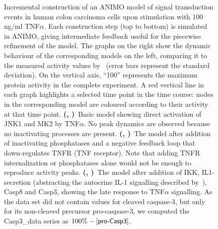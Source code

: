 \begin{figure}[!bhtp]
\begin{tabular}{ll}
\end{tabular}
  \caption{
Incremental construction of an ANIMO model of signal transduction
events in human colon carcinoma cells upon stimulation with 100 ng/ml TNF$\alpha$.
Each construction step (top to bottom) is simulated in ANIMO, giving intermediate feedback
useful for the piecewise refinement of the model.
The graphs on the right show the dynamic behaviour of the corresponding models on the left, comparing it to the measured
activity values by~\cite{pathway-compendium} (error bars represent the standard deviation).
On the vertical axis, ``100'' represents the maximum protein activity in the complete experiment.
A red vertical line in each graph highlights a selected time point in the time course:
nodes in the corresponding model are coloured according to their activity at that time point.
{\bf (\protect{}, \protect{})}~Basic model showing direct activation of JNK1 and MK2 by TNF$\alpha$.
No peak dynamics are observed because no inactivating processes are present.
{\bf (\protect{}, \protect{})}~The model after addition of inactivating phosphatases and a
negative feedback loop that down-regulates TNFR (TNF receptor). Note that adding TNFR internalization or phosphatases alone would not be enough to reproduce activity peaks.
{\bf (\protect{}, \protect{})}~The model after addition of IKK, IL1-secretion (abstracting
the autocrine IL-1 signalling described by~\citealp{pathway-autocrine}), Casp8 and Casp3, showing the late response to TNF$\alpha$ signalling.
As the data set did not contain values for cleaved caspase-3, but only for its non-cleaved precursor pro-caspase-3,
we computed the {\sf Casp3\_{}data} series as $100\% - [\mbox{\sf pro-Casp3}]$.}\label{fig:small-model}
\end{figure}